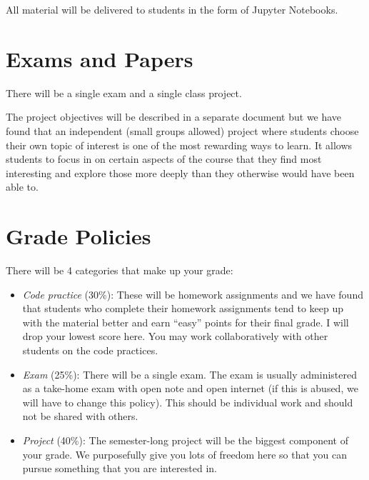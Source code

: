 \documentclass[11pt]{article}
\begin{document}
\begin{flushleft}
        All material will be delivered to students in the form of Jupyter Notebooks.

        \section{Exams and Papers}
        \label{exams-and-papers}

        There will be a single exam and a single class project.

        The project objectives will be described in a separate document but we
        have found that an independent (small groups allowed) project where
        students choose their own topic of interest is one of the most rewarding
        ways to learn. It allows students to focus in on certain aspects of the course
        that they find most interesting and explore those more deeply than they otherwise
        would have been able to.

        \section{Grade Policies}
        \label{grade-policies}

        There will be 4 categories that make up your grade:

        \begin{itemize}
            \item \textit{Code practice} (30\%): These will be homework
                assignments and we have found that students who complete their
                homework assignments tend to keep up with the material better
                and earn ``easy'' points for their final grade. I will drop your lowest
                score here. You may work collaboratively with other students on
                the code practices.

            \item \textit{Exam} (25\%): There will be a single exam. The exam is usually
                administered as a take-home exam with open note and open internet
                (if this is abused, we will have to change this policy). This should
                be individual work and should not be shared with others.

            \item \textit{Project} (40\%): The semester-long project will be the
                biggest component of your grade. We purposefully give you lots of
                freedom here so that you can pursue something that you are interested
                in.


\end{itemize}
\end{flushleft}
\end{document}
